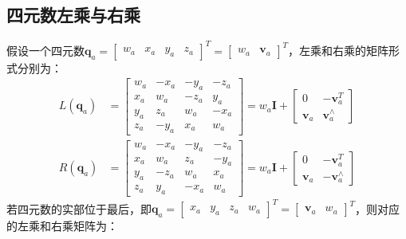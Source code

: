 \subsection{四元数左乘与右乘}
假设一个四元数$\bm{q}_a=\left[\begin{array}{cccc}w_a & x_a & y_a & z_a\end{array}\right]^T=\left[\begin{array}{cc}w_a & \bm{v}_a\end{array}\right]^T$，左乘和右乘的矩阵形式分别为：
\begin{equation}
\begin{aligned}
L\left(\bm{q}_a\right)&=\left[\begin{matrix}
w_a & -x_a & -y_a & -z_a\\
x_a &  w_a & -z_a &  y_a\\
y_a &  z_a &  w_a & -x_a\\
z_a & -y_a &  x_a &  w_a
\end{matrix}\right]=w_a\bm{I}+\left[\begin{matrix}
0 & -\bm{v}_a^T\\
\bm{v}_a & \bm{v}_a^\wedge
\end{matrix}\right]\\
R\left(\bm{q}_a\right)&=\left[\begin{matrix}
w_a & -x_a & -y_a & -z_a\\
x_a &  w_a &  z_a & -y_a\\
y_a & -z_a &  w_a &  x_a\\
z_a &  y_a & -x_a &  w_a
\end{matrix}\right]=w_a\bm{I}+\left[\begin{matrix}
0 & -\bm{v}_a^T\\
\bm{v}_a & -\bm{v}_a^\wedge
\end{matrix}\right]
\end{aligned}
\end{equation}
若四元数的实部位于最后，即$\bm{q}_a=\left[\begin{array}{cccc}x_a & y_a & z_a & w_a\end{array}\right]^T=\left[\begin{array}{cc}\bm{v}_a & w_a\end{array}\right]^T$，则对应的左乘和右乘矩阵为：
